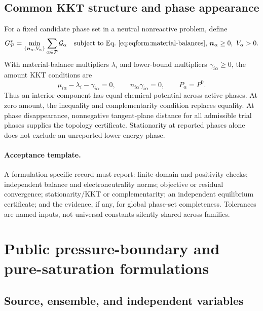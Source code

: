 \documentclass[11pt]{article}
\begin{document}
\subsection{Common KKT structure and phase appearance}

For a fixed candidate phase set in a neutral nonreactive problem, define
\begin{equation}
 G_{\mathcal P}^{*}=
 \min_{\{\boldsymbol n_\alpha,V_\alpha\}}
 \sum_{\alpha\in\mathcal P}\mathcal G_\alpha
 \quad\text{subject to Eq.~\eqref{eq:eqform:material-balances}, }
 \boldsymbol n_\alpha\geq0,\ V_\alpha>0.
\label{eq:eqform:generic-neutral-min}
\end{equation}
With material-balance multipliers \(\lambda_i\) and lower-bound multipliers
\(\gamma_{i\alpha}\geq0\), the amount KKT conditions are
\begin{equation}
 \mu_{i\alpha}-\lambda_i-\gamma_{i\alpha}=0,\qquad
 n_{i\alpha}\gamma_{i\alpha}=0,\qquad
 P_\alpha=P^0.
\label{eq:eqform:generic-neutral-kkt}
\end{equation}
Thus an interior component has equal chemical potential across active phases.
At zero amount, the inequality and complementarity condition replaces
equality. At phase disappearance, nonnegative tangent-plane distance for all
admissible trial phases supplies the topology certificate. Stationarity at
reported phases alone does not exclude an unreported lower-energy phase.

\paragraph{Acceptance template.}
A formulation-specific record must report: finite-domain and positivity
checks; independent balance and electroneutrality norms; objective or residual
convergence; stationarity/KKT or complementarity; an independent equilibrium
certificate; and the evidence, if any, for global phase-set completeness.
Tolerances are named inputs, not universal constants silently shared across
families.

\section{Public pressure-boundary and pure-saturation formulations}
\label{sec:eqform:public-boundary}

\subsection{Source, ensemble, and independent variables}
\end{document}
